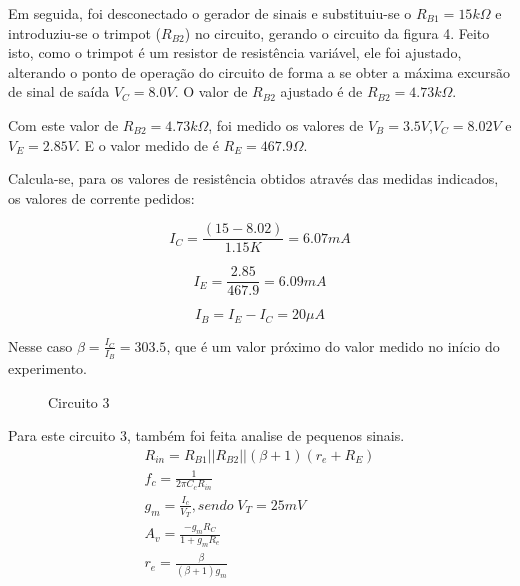 \documentclass[a4paper]{article} %
\begin{document}
\newpage


Em seguida, foi desconectado o gerador de sinais e substituiu-se o $R_{B1}=15k\Omega$
e introduziu-se o trimpot ($R_{B2}$) no circuito, gerando o circuito da figura 4. Feito isto,
como o trimpot é um resistor de resistência variável, ele foi ajustado, alterando o
ponto de operação do circuito de forma a se obter a máxima excursão de sinal de saída
$V_C=8.0V$. O valor de $R_{B2}$ ajustado é de $R_{B2}=4.73k\Omega$.

Com este valor de $R_{B2}=4.73k\Omega$, foi medido os valores de
$V_B=3.5V$,$V_C=8.02V$ e $V_E=2.85V$. E o valor medido de é $R_E=467.9\Omega$.

Calcula-se, para os valores de resistência obtidos através das medidas indicados, os
valores de corrente pedidos:

\begin{displaymath}
I_C =\frac{(15-8.02)}{1.15K} = 6.07 mA
\end{displaymath}

\begin{displaymath}
I_E =\frac{2.85}{467.9} = 6.09 mA
\end{displaymath}

\begin{displaymath}
I_B = I_E - I_C = 20 \mu A
\end{displaymath}

Nesse caso $\beta = \frac{I_C}{I_B} = 303.5$, que é um valor próximo do valor medido no início do
experimento.


\vspace{3mm}
\begin{figure}[h!]
\centerline{}
\caption{Circuito 3\label{circ:3}}
\end{figure}


Para este circuito 3, também foi feita analise de pequenos sinais.
\begin{eqnarray}
R_{in}=R_{B1}||R_{B2}||(\beta+1)(r_{e}+R_E)\\
f_c=\frac{1}{2\pi C_cR_{in}}\\
g_m=\frac{I_c}{V_T},sendo \; V_T = 25 mV\\
A_v=\frac{-g_mR_C}{1+g_mR_e}\\
r_{e}=\frac{\beta}{(\beta+1)g_m}
\end{eqnarray}
\end{document}
